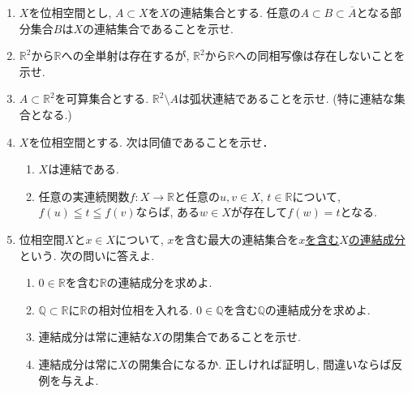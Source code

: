 \documentclass[dvipdfmx,a4paper,11pt]{article}
\newcommand{\R}{\mathbb{R}}
\newcommand{\Q}{\mathbb{Q}}
\theoremstyle{definition}
\begin{document}
\begin{enumerate}[label=\textbf{問}\ref*{sec-connected}.\arabic*]
\item  $X$を位相空間とし, $A \subset X$を$X$の連結集合とする. 任意の$A \subset B \subset \overline{A}$となる部分集合$B$は$X$の連結集合であることを示せ.

\item $\R^2$から$\R$への全単射は存在するが, $\R^2$から$\R$への同相写像は存在しないことを示せ.

\item $A \subset \R^2$を可算集合とする. $\R^2 \setminus A$は弧状連結であることを示せ. (特に連結な集合となる.)


\item $X$を位相空間とする. 次は同値であることを示せ．
\begin{enumerate}[label=(\roman*)]
	\setlength{\parskip}{0cm} 
  \setlength{\itemsep}{0pt} 
  \item $X$は連結である.
  \item 任意の実連続関数$f : X \rightarrow \R$と任意の$u,v \in X$, $t \in \R$について, $f(u) \leqq t \leqq f(v)$ならば, ある$w \in X$が存在して$f(w) = t$となる. 
\end{enumerate}



\newpage
\item 位相空間$X$と$x \in X$について, $x$を含む最大の連結集合を\underline{$x$を含む$X$の連結成分}という. 次の問いに答えよ. 
\begin{enumerate}
	\setlength{\parskip}{0cm} 
  \setlength{\itemsep}{0pt} 
  \item $0 \in \R$を含む$\R$の連結成分を求めよ.
  \item $\Q \subset \R$に$\R$の相対位相を入れる. $0 \in \Q$を含む$\Q$の連結成分を求めよ. 
  \item 連結成分は常に連結な$X$の閉集合であることを示せ.
  \item 連結成分は常に$X$の開集合になるか. 正しければ証明し, 間違いならば反例を与えよ.
\end{enumerate}



\end{enumerate}
\end{document}
